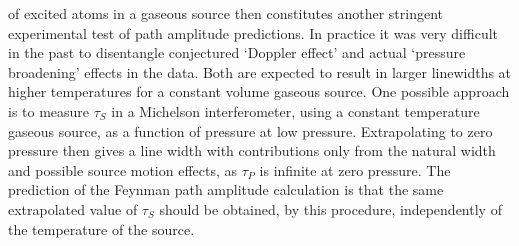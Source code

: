 {    of excited atoms in a gaseous source then constitutes another stringent experimental
    test of path amplitude predictions. In practice it was very difficult in the past
    to disentangle
    conjectured `Doppler effect' and actual `pressure broadening' effects in the data. Both are expected to
    result in larger linewidths at higher temperatures for a constant volume gaseous
    source. One possible approach is to measure $\tau_S$ in a Michelson interferometer,
     using a constant temperature gaseous source, as a function of pressure at low pressure.
    Extrapolating to zero pressure then gives a line width with contributions only from
   the natural width and possible source motion effects, as $\tau_P$ is infinite at
    zero pressure. The prediction of the Feynman path amplitude calculation is that the same
    extrapolated value of $\tau_S$ should be obtained, by this procedure, independently of the temperature
    of the source.
  
}
